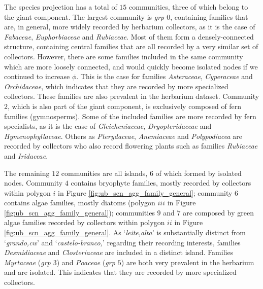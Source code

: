 The species projection has a total of $15$ communities, three of which belong to the giant component. 
%
The largest community is \textit{grp $0$}, containing families that are, in general, more widely recorded by herbarium collectors, as it is the case of \textit{Fabaceae}, \textit{Euphorbiaceae} and \textit{Rubiaceae}.
Most of them form a densely-connected structure, containing central families that are all recorded by a very similar set of collectors.
However, there are some families included in the same community which are more loosely connected, and would quickly become isolated nodes if we continued to increase $\phi$. 
This is the case for families \textit{Asteraceae}, \textit{Cyperaceae} and \textit{Orchidaceae}, which indicates that they are recorded by more specialized collectors.
These families are also prevalent in the herbarium dataset.
Community $2$, which is also part of the giant component, is exclusively composed of fern families (gymnosperms).
Some of the included families are more recorded by fern specialists, as it is the case of \textit{Gleicheniaceae}, \textit{Dryopteridaceae} and \textit{Hymenophyllaceae}.
Others as \textit{Pterydaceae}, \textit{Anemiaceae} and \textit{Polypodiacea} are recorded by collectors who also record flowering plants such as families \textit{Rubiaceae} and \textit{Iridaceae}.


The remaining $12$ communities are all islands, $6$ of which formed by isolated nodes.
%
Community $4$ contains bryophyte families, mostly recorded by collectors within polygon $i$ in Figure \ref{fig:ub_scn_agg_family_general};
%
community $6$ contains algae families, mostly diatoms (polygon $iii$ in Figure \ref{fig:ub_scn_agg_family_general});
%
communities $9$ and $7$ are composed by green algae families recorded by collectors within polygon $ii$ in Figure \ref{fig:ub_scn_agg_family_general}.
As `\textit{leite,alta}' is substantially distinct from `\textit{grando,cw}' and `\textit{castelo-branco,}' regarding their recording interests, families \textit{Desmidiaceae} and \textit{Closteriaceae} are included in a distinct island.
%
Families \textit{Myrtaceae} (\textit{grp $3$}) and \textit{Poaceae} (\textit{grp $5$}) are both very prevalent in the herbarium and are isolated.
This indicates that they are recorded by more specialized collectors.



